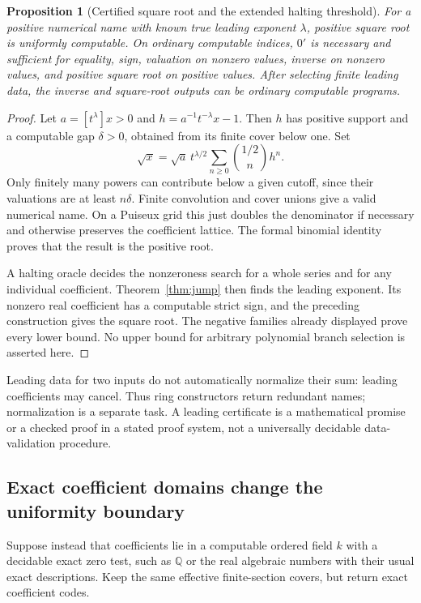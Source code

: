 \documentclass[11pt,letterpaper]{article}
\numberwithin{equation}{section}
\newtheorem{proposition}[theorem]{Proposition}
\theoremstyle{definition}
\theoremstyle{remark}
\newcommand{\Q}{\mathbb Q}
\begin{document}
\begin{proposition}[Certified square root and the extended halting threshold]
\label{prop:root-jump}
For a positive numerical name with known true leading exponent $\lambda$,
positive square root is uniformly computable. On ordinary computable indices,
$0'$ is necessary and sufficient for equality, sign, valuation on nonzero
values, inverse on nonzero values, and positive square root on positive values.
After selecting finite leading data, the inverse and square-root outputs
can be ordinary computable programs.
\end{proposition}
\begin{proof}
Let $a=[t^\lambda]x>0$ and $h=a^{-1}t^{-\lambda}x-1$.
Then $h$ has positive support and a computable gap $\delta>0$, obtained
from its finite cover below one. Set
\[
 \sqrt{x}=\sqrt a\,t^{\lambda/2}
       \sum_{n\ge0}\binom{1/2}{n}h^n.
\]
Only finitely many powers can contribute below a given cutoff, since their
valuations are at least $n\delta$. Finite convolution and cover unions give
a valid numerical name. On a Puiseux grid this just doubles the denominator
if necessary and otherwise preserves the coefficient lattice. The formal
binomial identity proves that the result is the positive root.

A halting oracle decides the nonzeroness search for a whole series and for
any individual coefficient. Theorem~\ref{thm:jump} then finds the leading
exponent. Its nonzero real coefficient has a computable strict sign, and
the preceding construction gives the square root. The negative families
already displayed prove every lower bound. No upper bound for arbitrary
polynomial branch selection is asserted here.
\end{proof}

Leading data for two inputs do not automatically normalize their sum: leading
coefficients may cancel. Thus ring constructors return redundant names;
normalization is a separate task. A leading certificate is a mathematical
promise or a checked proof in a stated proof system, not a universally
decidable data-validation procedure.

\subsection{Exact coefficient domains change the uniformity boundary}

Suppose instead that coefficients lie in a computable ordered field $k$
with a decidable exact zero test, such as $\Q$ or the real algebraic
numbers with their usual exact descriptions. Keep the same effective
finite-section covers, but return exact coefficient codes.
\end{document}
